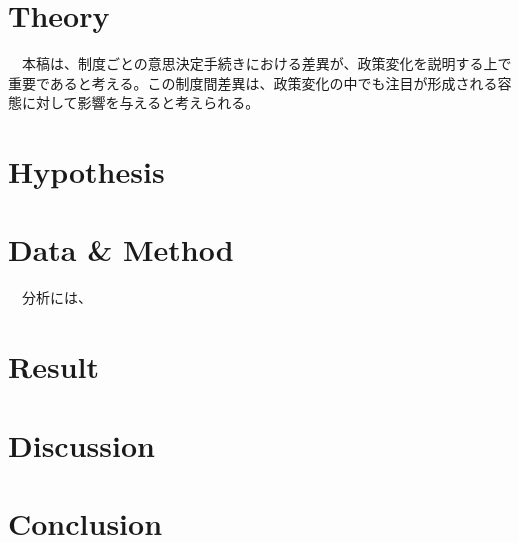 \section*{Theory}
　本稿は、制度ごとの意思決定手続きにおける差異が、政策変化を説明する上で重要であると考える。この制度間差異は、政策変化の中でも注目が形成される容態に対して影響を与えると考えられる。
　

\section*{Hypothesis}

\section*{Data \& Method}
　分析には、

\section*{Result}

\section*{Discussion}

\section*{Conclusion}
